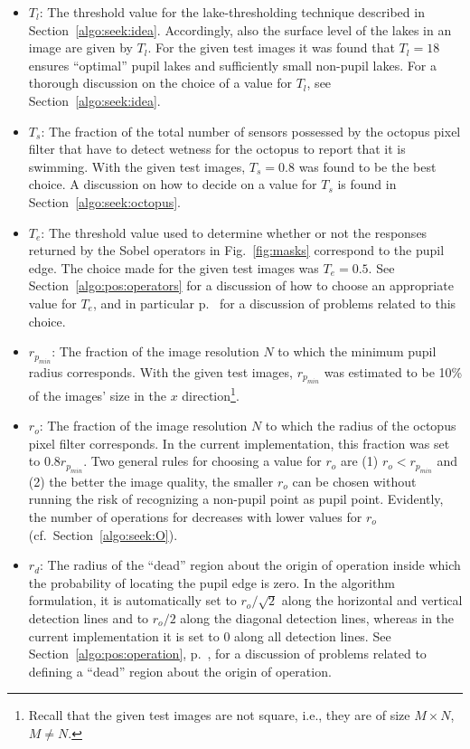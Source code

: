 \begin{itemize}
\item $T_{l}$: The threshold value for the lake-thresholding technique
  described in Section~\ref{algo:seek:idea}.  Accordingly, also the
  surface level of the lakes in an image are given by $T_{l}$.  For
  the given test images it was found that $T_{l}=18$ ensures
  ``optimal'' pupil lakes and sufficiently small non-pupil lakes.  For
  a thorough discussion on the choice of a value for $T_{l}$, see
  Section~\ref{algo:seek:idea}.
\item $T_{s}$: The fraction of the total number of sensors possessed
  by the octopus pixel filter that have to detect wetness for the
  octopus to report that it is swimming.  With the given test images,
  $T_{s}=0.8$ was found to be the best choice.  A discussion on how to
  decide on a value for $T_{s}$ is found in
  Section~\ref{algo:seek:octopus}.
\item $T_{e}$: The threshold value used to determine whether or not
  the responses returned by the Sobel operators in
  Fig.~\ref{fig:masks} correspond to the pupil edge.  The choice made
  for the given test images was $T_{e}=0.5$.  See
  Section~\ref{algo:pos:operators} for a discussion of how to choose
  an appropriate value for $T_{e}$, and in particular
  p.~\pageref{pg:TEproblems} for a discussion of problems related to
  this choice.
\item $r_{p_{min}}$: The fraction of the image resolution $N$ to which
  the minimum pupil radius corresponds.  With the given test images,
  $r_{p_{min}}$ was estimated to be 10\% of the images' size in the
  $x$ direction\footnote{\label{pg:notsquare}Recall that the given
    test images are not square, i.e., they are of size $M\times N$,
    $M\neq N$.}.
\item $r_{o}$: The fraction of the image resolution $N$ to which the
  radius of the octopus pixel filter corresponds.  In the current
  implementation, this fraction was set to $0.8r_{p_{min}}$.  Two
  general rules for choosing a value for $r_{o}$ are (1)
  $r_{o}<r_{p_{min}}$ and (2) the better the image quality, the
  smaller $r_{o}$ can be chosen without running the risk of
  recognizing a non-pupil point as pupil point.  Evidently, the number
  of operations for {\octopus} decreases with lower values for $r_{o}$
  (cf.\ Section~\ref{algo:seek:O}).
\item $r_{d}$: The radius of the ``dead'' region about the origin of
  operation inside which the probability of locating the pupil edge is
  zero.  In the algorithm formulation, it is automatically set to
  $r_{o}/\sqrt{2}$ along the horizontal and vertical detection lines
  and to $r_{o}/2$ along the diagonal detection lines, whereas in the
  current implementation it is set to 0 along all detection lines.
  See Section~\ref{algo:pos:operation}, p.~\pageref{pg:dead}, for a
  discussion of problems related to defining a ``dead'' region about
  the origin of operation.
\end{itemize}

